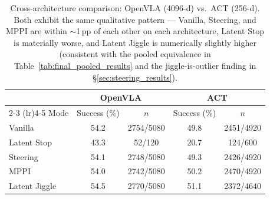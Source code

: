 \begin{table}[t]
\centering
\caption{Cross-architecture comparison: OpenVLA (4096-d) vs.\ ACT (256-d). Both exhibit the same qualitative pattern --- Vanilla, Steering, and MPPI are within $\sim$1\,pp of each other on each architecture, Latent Stop is materially worse, and Latent Jiggle is numerically slightly higher (consistent with the pooled equivalence in Table~\ref{tab:final_pooled_results} and the jiggle-is-outlier finding in \S\ref{sec:steering_results}).}
\label{tab:cross_arch}
\begin{tabular}{lcccc}
\toprule
 & \multicolumn{2}{c}{OpenVLA} & \multicolumn{2}{c}{ACT} \\
\cmidrule(lr){2-3} \cmidrule(lr){4-5}
Mode & Success (\%) & $n$ & Success (\%) & $n$ \\
\midrule
Vanilla & 54.2 & 2754/5080 & 49.8 & 2451/4920 \\
Latent Stop & 43.3 & 52/120 & 20.7 & 124/600 \\
Steering & 54.1 & 2748/5080 & 49.3 & 2426/4920 \\
MPPI & 54.0 & 2742/5080 & 50.2 & 2470/4920 \\
Latent Jiggle & 54.5 & 2770/5080 & 51.1 & 2372/4640 \\
\bottomrule
\end{tabular}
\end{table}
